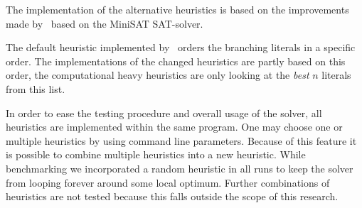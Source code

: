 The implementation of the alternative heuristics is based on the improvements 
made by~\cite{devriendt2012symmetry} based on the MiniSAT SAT-solver.

The default heuristic implemented by~\cite{devriendt2012symmetry} orders the 
branching literals in a specific order. The implementations of the changed heuristics 
are partly based on this order, the computational heavy heuristics are only looking 
at the \emph{best} $n$ literals from this list.

In order to ease the testing procedure and overall usage of the solver, all heuristics
are implemented within the same program. One may choose one or multiple heuristics 
by using command line parameters. Because of this feature it is possible to combine 
multiple heuristics into a new heuristic. While benchmarking we incorporated a random
heuristic in all runs to keep the solver from looping forever around some local optimum.
Further combinations of heuristics are not tested because this falls outside the scope
of this research.


